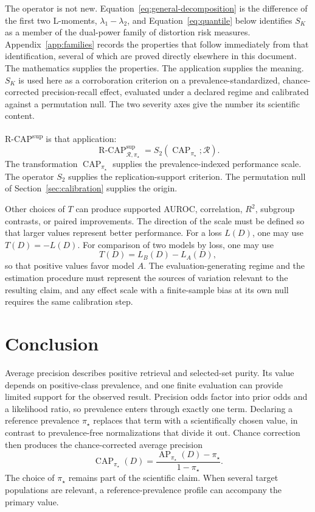 \documentclass[11pt]{article}
\newcommand{\AP}{\operatorname{AP}}
\newcommand{\CAP}{\operatorname{CAP}}
\newcommand{\Regime}{\mathcal{R}}
\newcommand{\Tpi}{\CAP_{\pi_\star}}
\newcommand{\RCAPfull}{\operatorname{R\text{-}CAP}^{\mathrm{sup}}_{\Regime,\pi_\star}}
\theoremstyle{remark}
\begin{document}
The operator is not new. Equation~\eqref{eq:general-decomposition} is the difference of the first two L-moments, $\lambda_1-\lambda_2$, and Equation~\eqref{eq:quantile} below identifies $S_K$ as a member of the dual-power family of distortion risk measures. Appendix~\ref{app:families} records the properties that follow immediately from that identification, several of which are proved directly elsewhere in this document. The mathematics supplies the properties. The application supplies the meaning. $S_K$ is used here as a corroboration criterion on a prevalence-standardized, chance-corrected precision-recall effect, evaluated under a declared regime and calibrated against a permutation null. The two severity axes give the number its scientific content.

R-CAP\textsuperscript{sup} is that application:
\begin{equation}
\RCAPfull
=
S_2(\CAP_{\pi_\star};\Regime).
\label{eq:rcap-as-support-operator}
\end{equation}
The transformation $\CAP_{\pi_\star}$ supplies the prevalence-indexed performance scale. The operator $S_2$ supplies the replication-support criterion. The permutation null of Section~\ref{sec:calibration} supplies the origin.

Other choices of $T$ can produce supported AUROC, correlation, $R^2$, subgroup contrasts, or paired improvements. The direction of the scale must be defined so that larger values represent better performance. For a loss $L(D)$, one may use $T(D)=-L(D)$. For comparison of two models by loss, one may use
\[
T(D)=L_B(D)-L_A(D),
\]
so that positive values favor model $A$. The evaluation-generating regime and the estimation procedure must represent the sources of variation relevant to the resulting claim, and any effect scale with a finite-sample bias at its own null requires the same calibration step.

\section{Conclusion}

Average precision describes positive retrieval and selected-set purity. Its value depends on positive-class prevalence, and one finite evaluation can provide limited support for the observed result. Precision odds factor into prior odds and a likelihood ratio, so prevalence enters through exactly one term. Declaring a reference prevalence $\pi_\star$ replaces that term with a scientifically chosen value, in contrast to prevalence-free normalizations that divide it out. Chance correction then produces the chance-corrected average precision
\[
\Tpi(D)
=
\frac{\AP_{\pi_\star}(D)-\pi_\star}{1-\pi_\star}.
\]
The choice of $\pi_\star$ remains part of the scientific claim. When several target populations are relevant, a reference-prevalence profile can accompany the primary value.
\end{document}
